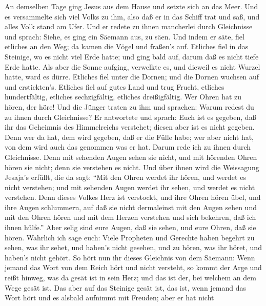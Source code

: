  An demselben Tage ging Jesus aus dem Hause und setzte sich
an das Meer.  Und es versammelte sich viel Volks zu ihm,
also daß er in das Schiff trat und saß, und alles Volk stand am Ufer.
 Und er redete zu ihnen mancherlei durch Gleichnisse und
sprach: Siehe, es ging ein Säemann aus, zu säen.  Und indem
er säte, fiel etliches an den Weg; da kamen die Vögel und fraßen's auf.
 Etliches fiel in das Steinige, wo es nicht viel Erde hatte;
und ging bald auf, darum daß es nicht tiefe Erde hatte.  Als
aber die Sonne aufging, verwelkte es, und dieweil es nicht Wurzel hatte,
ward es dürre.  Etliches fiel unter die Dornen; und die
Dornen wuchsen auf und erstickten's.  Etliches fiel auf
gutes Land und trug Frucht, etliches hundertfältig, etliches
sechzigfältig, etliches dreißigfältig.  Wer Ohren hat zu
hören, der höre!  Und die Jünger traten zu ihm und
sprachen: Warum redest du zu ihnen durch Gleichnisse?  Er
antwortete und sprach: Euch ist es gegeben, daß ihr das Geheimnis des
Himmelreichs verstehet; diesen aber ist es nicht gegeben. 
Denn wer da hat, dem wird gegeben, daß er die Fülle habe; wer aber nicht
hat, von dem wird auch das genommen was er hat.  Darum rede
ich zu ihnen durch Gleichnisse. Denn mit sehenden Augen sehen sie nicht,
und mit hörenden Ohren hören sie nicht; denn sie verstehen es nicht.
 Und über ihnen wird die Weissagung Jesaja's erfüllt, die
da sagt: ``Mit den Ohren werdet ihr hören, und werdet es nicht
verstehen; und mit sehenden Augen werdet ihr sehen, und werdet es nicht
verstehen.  Denn dieses Volkes Herz ist verstockt, und ihre
Ohren hören übel, und ihre Augen schlummern, auf daß sie nicht
dermaleinst mit den Augen sehen und mit den Ohren hören und mit dem
Herzen verstehen und sich bekehren, daß ich ihnen hülfe.'' 
Aber selig sind eure Augen, daß sie sehen, und eure Ohren, daß sie
hören.  Wahrlich ich sage euch: Viele Propheten und
Gerechte haben begehrt zu sehen, was ihr sehet, und haben's nicht
gesehen, und zu hören, was ihr höret, und haben's nicht gehört.
 So hört nun ihr dieses Gleichnis von dem Säemann:
 Wenn jemand das Wort von dem Reich hört und nicht
versteht, so kommt der Arge und reißt hinweg, was da gesät ist in sein
Herz; und das ist der, bei welchem an dem Wege gesät ist. 
Das aber auf das Steinige gesät ist, das ist, wenn jemand das Wort hört
und es alsbald aufnimmt mit Freuden;  aber er hat nicht
